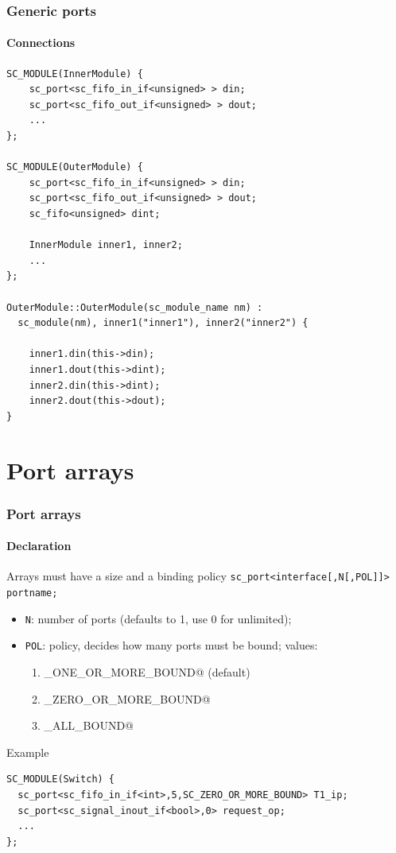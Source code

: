 \begin{frame}[fragile]
\frametitle{Generic ports}
\framesubtitle{Connections}
{\scriptsize 
\begin{verbatim}
SC_MODULE(InnerModule) {
    sc_port<sc_fifo_in_if<unsigned> > din;
    sc_port<sc_fifo_out_if<unsigned> > dout;
    ...
};

SC_MODULE(OuterModule) {
    sc_port<sc_fifo_in_if<unsigned> > din;
    sc_port<sc_fifo_out_if<unsigned> > dout;
    sc_fifo<unsigned> dint; 
     
    InnerModule inner1, inner2;
    ...
};

OuterModule::OuterModule(sc_module_name nm) : 
  sc_module(nm), inner1("inner1"), inner2("inner2") {
  
    inner1.din(this->din);
    inner1.dout(this->dint);
    inner2.din(this->dint);
    inner2.dout(this->dout);
}

\end{verbatim}
}
\vspace{-1em}
\end{frame}

\section{Port arrays}

\begin{frame}[fragile]
\frametitle{Port arrays}
\framesubtitle{Declaration}

\begin{block}{Arrays must have a size and a binding policy}
\texttt{sc\_port<interface[,N[,POL]]> portname;}
\begin{itemize}
\item \texttt{N}: number of ports (defaults to 1, use 0 for unlimited);
\item \texttt{POL}: policy, decides how many ports must be bound; values:
\begin{enumerate}
\item \verb@SC_ONE_OR_MORE_BOUND@ (default)
\item \verb@SC_ZERO_OR_MORE_BOUND@
\item \verb@SC_ALL_BOUND@
\end{enumerate}
\end{itemize}
\end{block}
\begin{block}{Example}
\vspace{-0.5em}
{\scriptsize 
\begin{verbatim}
SC_MODULE(Switch) {
  sc_port<sc_fifo_in_if<int>,5,SC_ZERO_OR_MORE_BOUND> T1_ip;
  sc_port<sc_signal_inout_if<bool>,0> request_op;
  ...
};
\end{verbatim}
}
\vspace{-0.5em}
\end{block}
\end{frame}

